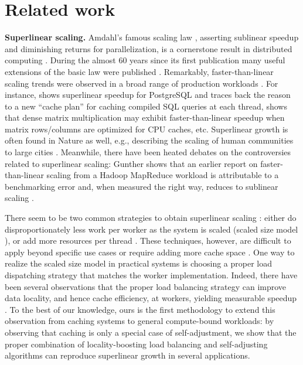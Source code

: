 \section{Related work}
\label{sec:related-work}

\noindent%
\textbf{Superlinear scaling.} %
Amdahl's famous scaling law \cite{10.1145/1465482.1465560}, asserting sublinear speedup and diminishing returns for parallelization, is a cornerstone result in distributed computing \cite{10.1145/42411.42415, 10.5555/775339.775386,1580395, 10.5555/1951599, 10.1145/42411.42415}. During the almost 60 years since its first publication many useful extensions of the basic law were published \cite{4563876, 6280307, 406581, 6163449, 10.5555/1951599,gunther2008generaltheorycomputationalscalability}. Remarkably, faster-than-linear scaling trends were observed in a broad range of production workloads \cite{scalability-analyzed, 10.1145/3627703.3629574, 10.5555/1012889.1012894, sdn-analytitcs, 556383, 7733347, 6483679, 10.1007/978-3-319-77610-1,dobb-1, dobb-2}. For instance, \cite{scalability-analyzed} shows superlinear speedup for PostgreSQL and traces back the reason to a new ``cache plan'' for caching compiled SQL queries at each thread, \cite{7733347} shows that dense matrix multiplication may exhibit faster-than-linear speedup when matrix rows\slash columns are optimized for CPU caches, etc. Superlinear growth is often found in Nature as well, e.g., describing the scaling of human communities to large cities \cite{PhysRevE.79.016115}.  Meanwhile, there have been heated debates on the controversies related to superlinear scaling: Gunther shows that an earlier report on faster-than-linear scaling from a Hadoop MapReduce workload is attributable to a benchmarking error and, when measured the right way, reduces to sublinear scaling \cite{10.1016/0167-8191(86)90024-4}. 

There seem to be two common strategies to obtain superlinear scaling \cite{7733347, 80148}: either do disproportionately less work per worker as the system is scaled (scaled size model \cite{7733347}), or add more resources per thread \cite{80148}. These techniques, however, are difficult to apply beyond specific use cases \cite{556383} or require adding more cache space \cite{7733347}. One way to realize the scaled size model in practical systems is choosing a proper load dispatching strategy that matches the worker implementation. Indeed, there have been several observations that the proper load balancing strategy can improve data locality, and hence cache efficiency, at workers, yielding measurable speedup \cite{10.1145/155332.155358}. To the best of our knowledge, ours is the first methodology to extend this observation from caching systems to general compute-bound workloads: by observing that caching is only a special case of self-adjustment, we show that the proper combination of locality-boosting load balancing and self-adjusting algorithms can reproduce superlinear growth in several applications.

